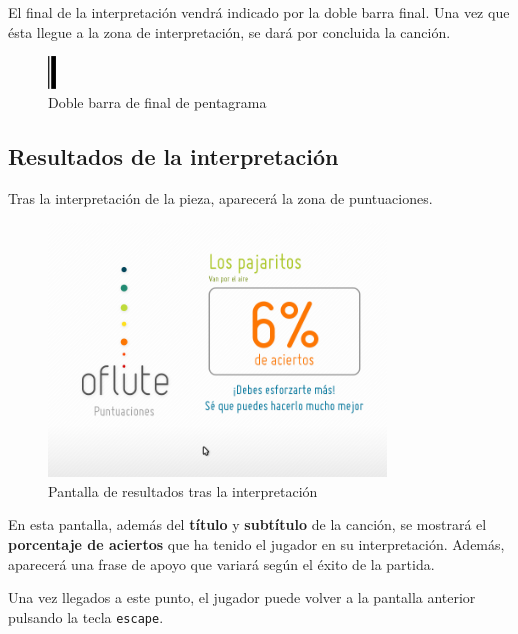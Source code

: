 El final de la interpretación vendrá indicado por la doble barra final. Una vez
que ésta llegue a la zona de interpretación, se dará por concluida la canción.

\begin{figure}[h!]
  \centering
  \includegraphics[width=0.02\textwidth]{apendice_manual_usuario/imagen_figFinal}
  \caption{Doble barra de final de pentagrama}
\end{figure}

\subsection{Resultados de la interpretación}
Tras la interpretación de la pieza, aparecerá la zona de puntuaciones.

\begin{figure}[h!]
  \centering
  \includegraphics[width=0.8\textwidth]{apendice_manual_usuario/imagen_seccionCanciones3}
  \caption{Pantalla de resultados tras la interpretación}
\end{figure}

En esta pantalla, además del \textbf{título} y \textbf{subtítulo} de la canción,
se mostrará el \textbf{porcentaje de aciertos} que ha tenido el jugador en su
interpretación. Además, aparecerá una frase de apoyo que variará según el éxito
de la partida.

Una vez llegados a este punto, el jugador puede volver a la pantalla anterior
pulsando la tecla \texttt{escape}.


